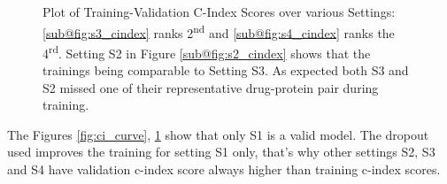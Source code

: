 \begin{figure} \centering
    \qquad
    \qquad
    \caption[Concordance Score during Training(b)]{ Plot of Training-Validation C-Index Scores over various Settings: \ref{sub@fig:s3_cindex} ranks 2\textsuperscript{nd} and \ref{sub@fig:s4_cindex} ranks the 4\textsuperscript{rd}. Setting S2 in Figure \ref{sub@fig:s2_cindex} shows that the trainings being comparable to Setting S3. As expected both S3 and S2 missed one of their representative drug-protein pair during training.
    }
    \label{fig:ci_curve_2}
\end{figure}

The Figures \ref{fig:ci_curve}, \ref{fig:ci_curve_2} show that only S1 is a valid model. The dropout used improves the training for setting S1 only, that's why other settings S2, S3 and S4 have validation c-index score always higher than training c-index scores.

